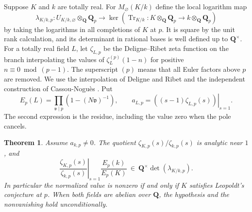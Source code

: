 \documentclass[11pt]{amsart}
\numberwithin{equation}{section}
\newtheorem{theorem}{Theorem}[section]
\theoremstyle{definition}
\theoremstyle{remark}
\newcommand{\Q}{\mathbf Q}
\newcommand{\Tr}{\operatorname{Tr}}
\begin{document}
Suppose $K$ and $k$ are totally real. For
$M_\varnothing(K/k)$ define the local logarithm map
\begin{equation}\label{eq:relplog}
 \lambda_{K/k,p}:U_{K/k,\varnothing}\otimes_\Q\Q_p
 \longrightarrow
 \ker\left(\Tr_{K/k}:K\otimes_\Q\Q_p\to k\otimes_\Q\Q_p\right)
\end{equation}
by taking the logarithms in all completions of $K$ at $p$.
It is square by the unit rank calculation, and its determinant
in rational bases is well defined up to $\Q^\times$.
For a totally real field $L$, let $\zeta_{L,p}$ be the
Deligne--Ribet zeta function on the branch interpolating
the values of $\zeta_L^{(p)}(1-n)$ for positive
$n\equiv0\bmod(p-1)$. The superscript $(p)$ means that all Euler
factors above $p$ are removed. We use the interpolation of Deligne
and Ribet and the independent construction of Cassou-Nogu\`es
\cite{DR,Cassou}. Put
\[
 E_p(L)=\prod_{\mathfrak v\mid p}(1-(N\mathfrak v)^{-1}),
 \qquad
 a_{L,p}=\left.((s-1)\zeta_{L,p}(s))\right|_{s=1}.
\]
The second expression is the residue, including the value zero
when the pole cancels.

\begin{theorem}\label{thm:prelative}
Assume $a_{k,p}\ne0$. The quotient
$\zeta_{K,p}(s)/\zeta_{k,p}(s)$ is analytic near $1$, and
\begin{equation}\label{eq:relativepadicvalue}
 \left.\frac{\zeta_{K,p}(s)}{\zeta_{k,p}(s)}\right|_{s=1}
 \frac{E_p(k)}{E_p(K)}
 \ \in\ \Q^\times\det(\lambda_{K/k,p}).
\end{equation}
In particular the normalized value is nonzero if and only if
$K$ satisfies Leopoldt's conjecture at $p$. When both fields
are abelian over $\Q$, the hypothesis and the nonvanishing
hold unconditionally.
\end{theorem}
\end{document}
